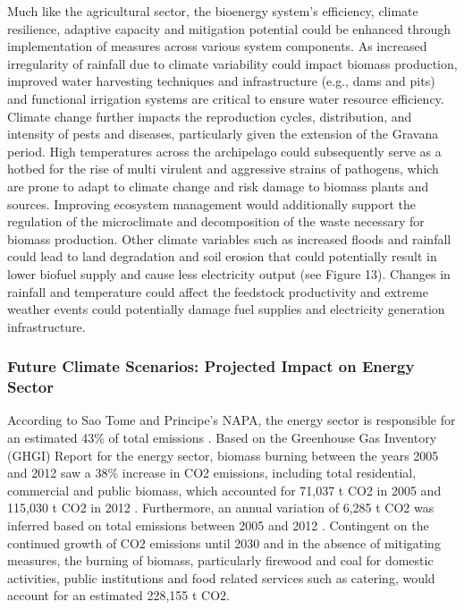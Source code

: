 \documentclass[
]{book}
\begin{document}
Much like the agricultural sector, the bioenergy system's efficiency, climate resilience, adaptive capacity and mitigation potential could be enhanced through implementation of measures across various system components. As increased irregularity of rainfall due to climate variability could impact biomass production, improved water harvesting techniques and infrastructure (e.g., dams and pits) and functional irrigation systems are critical to ensure water resource efficiency. Climate change further impacts the reproduction cycles, distribution, and intensity of pests and diseases, particularly given the extension of the Gravana period. High temperatures across the archipelago could subsequently serve as a hotbed for the rise of multi virulent and aggressive strains of pathogens, which are prone to adapt to climate change and risk damage to biomass plants and sources. Improving ecosystem management would additionally support the regulation of the microclimate and decomposition of the waste necessary for biomass production. Other climate variables such as increased floods and rainfall could lead to land degradation and soil erosion that could potentially result in lower biofuel supply and cause less electricity output (see Figure 13). Changes in rainfall and temperature could affect the feedstock productivity and extreme weather events could potentially damage fuel supplies and electricity generation infrastructure.

\hypertarget{future-climate-scenarios-projected-impact-on-energy-sector-1}{%
\subsubsection{Future Climate Scenarios: Projected Impact on Energy Sector}\label{future-climate-scenarios-projected-impact-on-energy-sector-1}}

According to Sao Tome and Principe's NAPA, the energy sector is responsible for an estimated 43\% of total emissions . Based on the Greenhouse Gas Inventory (GHGI) Report for the energy sector, biomass burning between the years 2005 and 2012 saw a 38\% increase in CO2 emissions, including total residential, commercial and public biomass, which accounted for 71,037 t CO2 in 2005 and 115,030 t CO2 in 2012 . Furthermore, an annual variation of 6,285 t CO2 was inferred based on total emissions between 2005 and 2012 . Contingent on the continued growth of CO2 emissions until 2030 and in the absence of mitigating measures, the burning of biomass, particularly firewood and coal for domestic activities, public institutions and food related services such as catering, would account for an estimated 228,155 t CO2.
\end{document}

